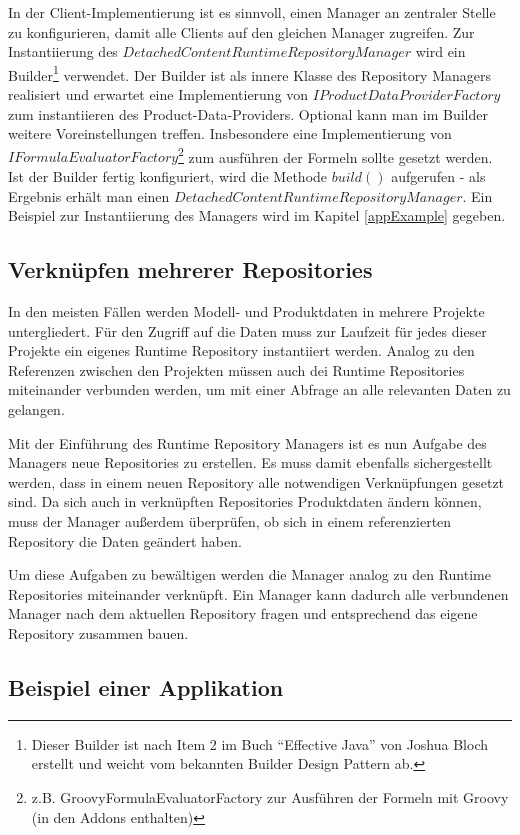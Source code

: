 \documentclass[headsepline=true, footsepline=true]{scrartcl}
\begin{document}
In der Client-Implementierung ist es sinnvoll, einen Manager an zentraler Stelle
zu konfigurieren, damit alle Clients auf den gleichen Manager zugreifen. Zur
Instantiierung des $DetachedContentRuntimeRepositoryManager$ wird ein
Builder\footnote{Dieser Builder ist nach Item 2 im Buch "`Effective Java"' von
Joshua Bloch \cite{effectiveJava} erstellt und weicht vom bekannten Builder
Design Pattern ab.} verwendet. Der Builder ist als innere Klasse des
Repository Managers realisiert und erwartet eine Implementierung von
$IProductDataProviderFactory$ zum instantiieren des Product-Data-Providers.
Optional kann man im Builder weitere Voreinstellungen treffen. Insbesondere eine Implementierung von $IFormulaEvaluatorFactory$\footnote{z.B.
GroovyFormulaEvaluatorFactory zur Ausführen der Formeln mit Groovy (in den
Addons enthalten)} zum ausführen der Formeln sollte gesetzt werden. Ist der
Builder fertig konfiguriert, wird die Methode $build()$ aufgerufen - als Ergebnis erhält man einen $DetachedContentRuntimeRepositoryManager$. 
Ein Beispiel zur Instantiierung des Managers wird im Kapitel \ref{appExample}
gegeben.

\subsection{Verknüpfen mehrerer Repositories}

In den meisten Fällen werden Modell- und Produktdaten in mehrere Projekte
untergliedert. Für den Zugriff auf die Daten muss zur Laufzeit für jedes dieser
Projekte ein eigenes Runtime Repository instantiiert werden.
Analog zu den Referenzen zwischen den Projekten müssen auch dei Runtime
Repositories miteinander verbunden werden, um mit einer Abfrage an alle
relevanten Daten zu gelangen.

Mit der Einführung des Runtime Repository Managers ist es nun Aufgabe des
Managers neue Repositories zu erstellen. Es muss damit ebenfalls sichergestellt
werden, dass in einem neuen Repository alle notwendigen Verknüpfungen gesetzt
sind. Da sich auch in verknüpften Repositories Produktdaten ändern können, muss
der Manager außerdem überprüfen, ob sich in einem referenzierten Repository die
Daten geändert haben.

Um diese Aufgaben zu bewältigen werden die Manager analog zu den Runtime
Repositories miteinander verknüpft. Ein Manager kann dadurch alle verbundenen
Manager nach dem aktuellen Repository fragen und entsprechend das eigene
Repository zusammen bauen.

\subsection{Beispiel einer Applikation}
\end{document}
